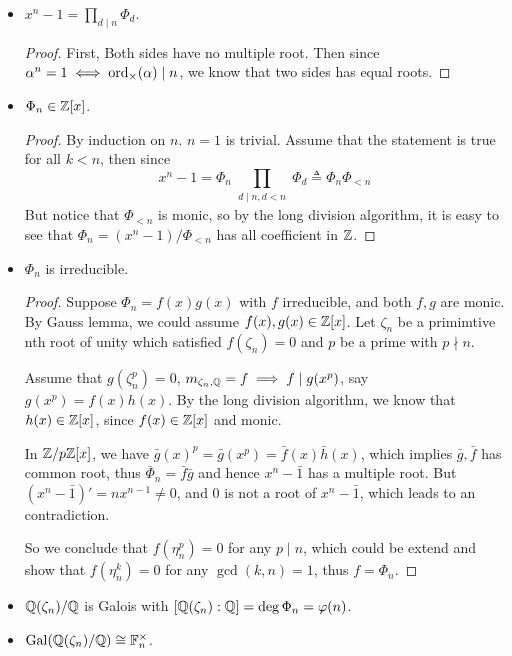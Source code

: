 \begin{prop} \hfill
  \begin{itemize}
    \item $x^n - 1 = \prod_{d \mid n} \Phi_d$.
      \begin{proof}
        First, Both sides have no multiple root. Then since $\alpha^n = 1 \iff \operatorname{ord}_{\times}(\alpha) \mid n$,
        we know that two sides has equal roots.
      \end{proof}
    \item $\Phi_n \in \mathbb{Z}[x]$.
      \begin{proof}
        By induction on $n$. $n = 1$ is trivial.
        Assume that the statement is true for all $k < n$, then since
        \[ x^n - 1 = \Phi_n \prod_{\substack{d \mid n, d < n}} \Phi_d \triangleq \Phi_n \Phi_{< n} \]
        But notice that $\Phi_{<n}$ is monic, so by the long division algorithm, it is easy to
        see that $\Phi_n = (x^n - 1) / \Phi_{<n}$ has all coefficient in $\mathbb{Z}$.
      \end{proof}
    \item $\Phi_n$ is irreducible.
      \begin{proof}
        Suppose $\Phi_n = f(x) g(x)$ with $f$ irreducible, and both $f, g$ are monic.
        By Gauss lemma, we could assume $f(x), g(x) \in \mathbb{Z}[x]$.
        Let $\zeta_n$ be a primimtive nth root of unity  which satisfied $f(\zeta_n) = 0$
        and $p$ be a prime with $p \nmid n$.

        Assume that $g(\zeta_n^p) = 0$, $m_{\zeta_n, \mathbb{Q}} = f \implies f \mid g(x^p)$,
        say $g(x^p) = f(x) h(x)$.
        By the long division algorithm, we know that $h(x) \in \mathbb{Z}[x]$, since $f(x) \in \mathbb{Z}[x]$
        and monic.

        In $\mathbb{Z} / p\mathbb{Z}[x]$, we have $\bar{g}(x)^p = \bar{g}(x^p) = \bar{f}(x) \bar{h}(x)$,
        which implies $\bar{g}, \bar{f}$ has common root, thus $\bar\Phi_n = \bar{f}\bar{g}$ and
        hence $x^n - \bar{1}$ has a multiple root.
        But $(x^n - \bar{1})' = nx^{n-1} \neq 0$, and $0$ is not a root of $x^n - \bar{1}$,
        which leads to an contradiction.

        So we conclude that $f(\eta_n^p) = 0$ for any $p \mid n$, which could be extend
        and show that $f(\eta_n^k) = 0$ for any $\gcd(k, n) = 1$, thus $f = \Phi_n$.
      \end{proof}
    \item $\mathbb{Q}(\zeta_n) / \mathbb{Q}$ is Galois with $[\mathbb{Q}(\zeta_n): \mathbb{Q}] = \deg \Phi_n = \varphi(n)$.
    \item $\operatorname{Gal}(\mathbb{Q}(\zeta_n) / \mathbb{Q}) \cong \mathbb{F}_n^\times$.
  \end{itemize}
\end{prop}

